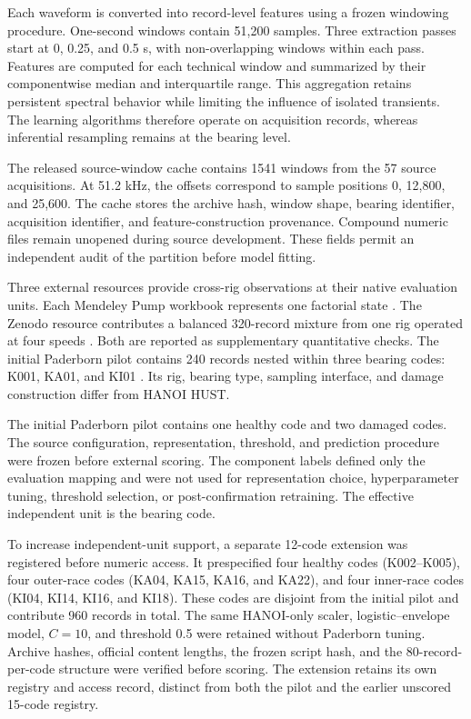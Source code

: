 \documentclass[machines,article,submit,oneauthor,pdftex]{Definitions/mdpi}
\begin{document}
Each waveform is converted into record-level features using a frozen windowing procedure. One-second windows contain 51,200 samples. Three extraction passes start at 0, 0.25, and 0.5 s, with non-overlapping windows within each pass. Features are computed for each technical window and summarized by their componentwise median and interquartile range. This aggregation retains persistent spectral behavior while limiting the influence of isolated transients. The learning algorithms therefore operate on acquisition records, whereas inferential resampling remains at the bearing level.

The released source-window cache contains 1541 windows from the 57 source acquisitions. At 51.2 kHz, the offsets correspond to sample positions 0, 12,800, and 25,600. The cache stores the archive hash, window shape, bearing identifier, acquisition identifier, and feature-construction provenance. Compound numeric files remain unopened during source development. These fields permit an independent audit of the partition before model fitting.

Three external resources provide cross-rig observations at their native evaluation units. Each Mendeley Pump workbook represents one factorial state \cite{r41}. The Zenodo resource contributes a balanced 320-record mixture from one rig operated at four speeds \cite{r42}. Both are reported as supplementary quantitative checks. The initial Paderborn pilot contains 240 records nested within three bearing codes: K001, KA01, and KI01 \cite{r43,r46}. Its rig, bearing type, sampling interface, and damage construction differ from HANOI HUST.

The initial Paderborn pilot contains one healthy code and two damaged codes. The source configuration, representation, threshold, and prediction procedure were frozen before external scoring. The component labels defined only the evaluation mapping and were not used for representation choice, hyperparameter tuning, threshold selection, or post-confirmation retraining. The effective independent unit is the bearing code.

To increase independent-unit support, a separate 12-code extension was registered before numeric access. It prespecified four healthy codes (K002--K005), four outer-race codes (KA04, KA15, KA16, and KA22), and four inner-race codes (KI04, KI14, KI16, and KI18). These codes are disjoint from the initial pilot and contribute 960 records in total. The same HANOI-only scaler, logistic--envelope model, $C=10$, and threshold 0.5 were retained without Paderborn tuning. Archive hashes, official content lengths, the frozen script hash, and the 80-record-per-code structure were verified before scoring. The extension retains its own registry and access record, distinct from both the pilot and the earlier unscored 15-code registry.
\end{document}
